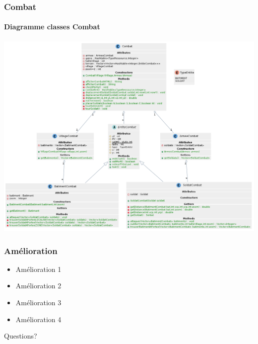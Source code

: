 \documentclass[aspectratio=169]{beamer}
\begin{document}
    \begin{frame}
        \frametitle{Combat}
        \framesubtitle{Diagramme classes Combat}
        \begin{center}
            \includegraphics[scale=0.2]{images/ClassesCombat.png}
        \end{center}
    \end{frame}

    \begin{frame}
        \frametitle{Amélioration}
        \begin{itemize}
            \item Amélioration 1
            \item Amélioration 2
            \item Amélioration 3
            \item Amélioration 4
        \end{itemize}
    \end{frame}

    \begin{frame}
        \begin{center}
            Questions?
        \end{center}
    \end{frame}
\end{document}

